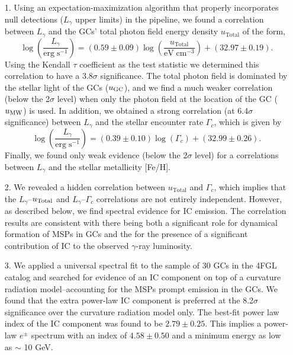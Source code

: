 \documentclass[doublespace,nopageskip]{VTthesis} %
\begin{document}
\begin{itemize}
    \item[1.] Using an expectation-maximization algorithm that properly incorporates null detections ($L_\gamma$ upper limits) in the pipeline, we found a correlation between $L_\gamma$ and the GCs' total photon field energy density $u_\mathrm{Total}$ of the form, \begin{equation}
    \log\left(\frac{L_\gamma}{\mathrm{erg}\;\mathrm{s}^{-1}}\right) = (0.59 \pm 0.09)\log\left(\frac{u_\mathrm{Total}}{\mathrm{eV}\;\mathrm{cm}^{-3}}\right) + (32.97 \pm 0.19).
    \end{equation}
    Using the Kendall $\tau$ coefficient as the test statistic we determined this correlation to have a $3.8\sigma$ significance. The total photon field is dominated by the stellar light of the GCs  ($u_{\rm GC}$), and we find a much weaker correlation (below the 2$\sigma$ level) when only the photon field at the location of the GC ($u_{\rm MW}$) is used. In addition, we obtained a strong correlation (at 6.4$\sigma$ significance) between $L_\gamma$ and the stellar encounter rate $\Gamma_c$, which is given by 
    \begin{equation}
    \log\left(\frac{L_\gamma}{\mathrm{erg}\;\mathrm{s}^{-1}}\right) = (0.39 \pm 0.10)\log\left(\Gamma_c\right) + (32.99 \pm 0.26).
    \end{equation}
    Finally, we found only weak evidence (below the 2$\sigma$ level) for a correlations between $L_\gamma$ and the stellar metallicity [Fe/H].
    \item[2.] We revealed a hidden correlation between $u_\mathrm{Total}$ and $\Gamma_c$, which implies that the $L_\gamma$--$u_{\rm Total}$ and $L_\gamma$--$\Gamma_c$ correlations are not entirely independent. However, as described below, we find spectral evidence for IC emission. The correlation results are consistent with there being both a significant role for dynamical formation of MSPs in GCs and the for the presence of a significant contribution of IC to the observed $\gamma$-ray luminosity.
    \item[3.] We applied a universal spectral fit to the sample of 30 GCs in the 4FGL catalog and searched for evidence of an IC component on top of a curvature radiation model--accounting for the MSPs prompt emission in the GCs. We found that the extra power-law IC component is preferred at the 8.2$\sigma$ significance over the curvature radiation model only. The best-fit power law index of the IC component was found to be $2.79 \pm 0.25$. This implies a power-law $e^\pm$ spectrum with an index of $4.58 \pm 0.50$ and a minimum energy as low as $\sim$ 10 GeV. 

\end{itemize}
\end{document}
